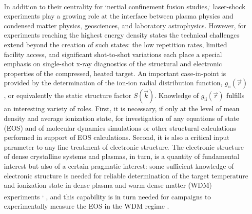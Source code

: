 In addition to their centrality for inertial confinement fusion
studies,\hyperref[j.-d.-lindl-p.-amendt-r.-l.-berger-s.-g.-glendinning-s.-h.-glenzer-s.-w.-haan-r.-l.-kauffman-o.-l.-landen-and-l.-j.-suter-physics-of-plasmas-11-339-2004.]\cite{LINDL2004PHYSICS}\textsuperscript{,}
\hyperref[e.-i.-moses-nuclear-fusion-49-104022-2009.]\cite{MOSES2009IGNITION}
laser-shock experiments play a growing role at the interface between
plasma physics and condensed matter physics, geosciences, and laboratory
astrophysics.\hyperref[f.-langenhorst-m.-boustie-a.-migault-and-j.-p.-romain-earth-and-planetary-science-letters-173-333-1999.]\cite{LANGENHORST1999LASER, GATTACCECA2010UNRAVELING, TAKABE2008HIGH, SILVA2004PROTON, REMINGTON2000REVIEW, PARK2012STUDYING, KOENIG2006RADIATIVE, MACCHI2013ION, GREGORI2012GENERATION, FIUZA2012WEIBEL, DOLLAR2013SCALING, AKLI2008LASER}
However, for experiments reaching the highest energy density states the
technical challenges extend beyond the creation of such states: the low
repetition rates, limited facility access, and significant shot-to-shot
variations each place a special emphasis on single-shot x-ray
diagnostics of the structural and electronic properties of the
compressed, heated
target.\hyperref[b.-k.-f.-young-et-al.-review-of-scientific-instruments-69-4049-1998.]\cite{YOUNG1998HIGH, OADES2004TARGET, WORKMAN2001X, STOECKL2001HARD, LANDEN2001X, HUDSON2002HIGH, DEWALD2004DANTE}
An important case-in-point is provided by the determination of the
ion-ion radial distribution function,
\(g_{\text{ii}}\left( \overrightarrow{r} \right)\), or equivalently the
static structure factor \(S(\overrightarrow{k})\). Knowledge of
\(g_{\text{ii}}\left( \overrightarrow{r} \right)\) fulfills an
interesting variety of roles. First, it is necessary, if only at the
level of mean density and average ionization state, for investigation of
any equations of state (EOS) and of molecular dynamics simulations or
other structural calculations performed in support of EOS calculations.
Second, it is also a critical input parameter to any fine treatment of
electronic structure. The electronic structure of dense crystalline
systems and plasmas, in turn, is a quantity of fundamental interest but
also of a certain pragmatic interest: some sufficient knowledge of
electronic structure is needed for reliable determination of the target
temperature and ionization state in dense plasma and warm dense matter
(WDM) experiments
\hyperref[s.-h.-glenzer-and-r.-redmer-reviews-of-modern-physics-81-1625-2009.]\cite{GLENZER2009X}\textsuperscript{,}
\hyperref[g.-gregori-et-al.-physics-of-plasmas-11-2754-2004.]\cite{GREGORI2004ELECTRONIC}\hyperref[s.-h.-glenzer-and-r.-redmer-reviews-of-modern-physics-81-1625-2009.]{},
and this capability is in turn needed for campaigns to experimentally
measure the EOS in the WDM regime
\hyperref[h.-j.-lee-et-al.-physical-review-letters-102-115001-2009.]\cite{LEE2009X, FORTMANN2012MEASUREMENT, MATTERN2013CONDENSED}.

